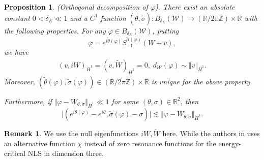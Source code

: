 \documentclass[reqno, 11pt]{amsart}
\numberwithin{equation}{section}
\newcommand{\Z}{{\mathbb{Z}}}
\newcommand{\R}{\mathbb{R}}
\theoremstyle{plain}
\newtheorem{proposition}[theorem]{Proposition}
\theoremstyle{definition}
\newtheorem{remark}[theorem]{Remark}
\numberwithin{equation}{section}
\numberwithin{theorem}{section}
\numberwithin{equation}{section}
\numberwithin{equation}{section}
\numberwithin{theorem}{section}
\begin{document}
	
	
	\begin{proposition}(Orthogonal decomposition of $\varphi$)\label{prop:orth decom}. There exist an absolute constant $0<\delta_E\ll1$ and a $C^1$ function $\left(\widetilde{\theta},\widetilde{\sigma} \right):B_{\delta_E}(\mathcal{W}) \rightarrow (\R/2\pi\Z)\times \R$ with the following properties. For any $\varphi\in B_{\delta_E}(\mathcal{W})$, putting 
		\begin{equation}\label{decom:var}
		\varphi=e^{i\widetilde{\theta}(\varphi)}S_{-1}^{\widetilde{\sigma}(\varphi)}(W+v),
		\end{equation}	
		we have 
		\begin{equation*}
		\begin{aligned}
		(v,iW)_{\dot H^1}=(v,\widetilde{W})_{\dot H^1}=0, \; d_{\mathcal{W}}(\varphi)\sim \Vert v\Vert_{\dot H^1}.
		\end{aligned}
		\end{equation*}
		Moreover, $\left(\widetilde{\theta}(\varphi),\widetilde{\sigma} (\varphi)\right) \in  (\R/2\pi\Z)\times \R$ is unique for the above property. 
		
		Furthermore, if $\Vert \varphi-W_{\theta,\sigma}\Vert_{\dot H^1} \ll 1$ for some $(\theta,\sigma)\in\R^2$, then 
		\begin{equation*}
		\big|\left(e^{i\widetilde{\theta}(\varphi)}-e^{i\theta}, \widetilde{\sigma}(\varphi)-\sigma \right)\big|\lesssim \Vert \varphi-W_{\theta,\sigma}\Vert_{\dot H^1}.
		\end{equation*}
	\end{proposition}

\begin{remark}
	We use the null eigenfunctions $iW, \widetilde{W}$  here. While the authors in \cite{NakR} uses an alternative function $\chi$ instead of  zero resonance functions for the energy-critical NLS in dimension three.
\end{remark}
\end{document}
